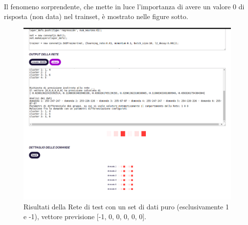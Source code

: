 Il fenomeno sorprendente, che mette in luce l'importanza di avere un valore 0 di risposta (non data) nel trainset, \`e mostrato nelle figure sotto.
\begin{figure}[H]
\centering
	\includegraphics[width=1\linewidth]{./image/RetediProva_generatorinputpuro.png}
	\caption{Risultati della Rete di test con un set di dati puro (esclusivamente 1 e -1), vettore previsione [-1, 0, 0, 0, 0, 0].}
	\label{Risultati della Rete di test con un set di dati puro (esclusivamente 1 e -1), vettore previsione [-1, 0, 0, 0, 0, 0].}
\end{figure}
\noindent

